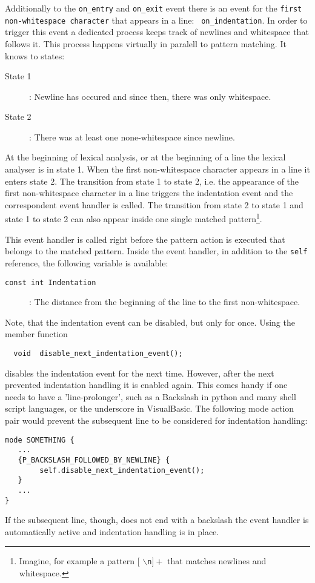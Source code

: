 Additionally to the {\tt on\_entry} and {\tt on\_exit} event there is an event
for the {\tt first non-whitespace character} that appears in a line: {\tt
  on\_indentation}. In order to trigger this event a dedicated process keeps
track of newlines and whitespace that follows it. This process happens
virtually in paralell to pattern matching. It knows to states:

\begin{description}
\item[State 1]: Newline has occured and since then, there was only whitespace.
\item[State 2]: There was at least one none-whitespace since newline.
\end{description}
  
At the beginning of lexical analysis, or at the beginning of a line the
lexical analyser is in state 1. When the first non-whitespace character
appears in a line it enters state 2. The transition from state 1 to state 2,
i.e. the appearance of the first non-whitespace character in a line triggers
the indentation event and the correspondent event handler is called. The
transition from state 2 to state 1 and state 1 to state 2 can also appear
inside one single matched pattern\footnote{Imagine, for example a pattern 
$[$ $\backslash${\tt n}$]+$ that matches newlines and whitespace.}.

This event handler is called right before the pattern action is executed that
belongs to the matched pattern. Inside the event handler, in addition to the
{\tt self} reference, the following variable is available:

\begin{description}
\item[\tt const int Indentation]: The distance from the beginning of the line
  to the first non-whitespace.
\end{description}

Note, that the indentation event can be disabled, but only for once. Using the
member function

\begin{lstlisting}
  void  disable_next_indentation_event();
\end{lstlisting}

disables the indentation event for the next time. However, after the next
prevented indentation handling it is enabled again. This comes handy if one
needs to have a 'line-prolonger', such as a Backslash in python and many shell
script languages, or the underscore in VisualBasic. The following mode action
pair would prevent the subsequent line to be considered for indentation
handling:

\begin{lstlisting}
mode SOMETHING {
   ...
   {P_BACKSLASH_FOLLOWED_BY_NEWLINE} {
        self.disable_next_indentation_event();
   }
   ...
}
\end{lstlisting}

If the subsequent line, though, does not end with a backslash the event
handler is automatically active and indentation handling is in place.


